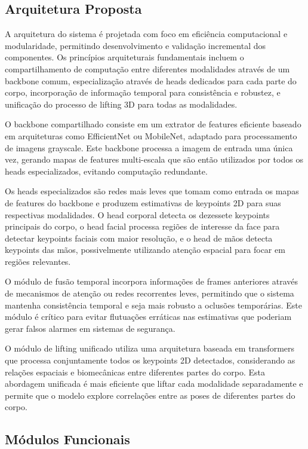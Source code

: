\documentclass[12pt, a4paper]{article}
\begin{document}
\subsection{Arquitetura Proposta}

A arquitetura do sistema é projetada com foco em eficiência computacional e modularidade, permitindo desenvolvimento e validação incremental dos componentes. Os princípios arquiteturais fundamentais incluem o compartilhamento de computação entre diferentes modalidades através de um backbone comum, especialização através de heads dedicados para cada parte do corpo, incorporação de informação temporal para consistência e robustez, e unificação do processo de lifting 3D para todas as modalidades.

O backbone compartilhado consiste em um extrator de features eficiente baseado em arquiteturas como EfficientNet ou MobileNet, adaptado para processamento de imagens grayscale. Este backbone processa a imagem de entrada uma única vez, gerando mapas de features multi-escala que são então utilizados por todos os heads especializados, evitando computação redundante.

Os heads especializados são redes mais leves que tomam como entrada os mapas de features do backbone e produzem estimativas de keypoints 2D para suas respectivas modalidades. O head corporal detecta os dezessete keypoints principais do corpo, o head facial processa regiões de interesse da face para detectar keypoints faciais com maior resolução, e o head de mãos detecta keypoints das mãos, possivelmente utilizando atenção espacial para focar em regiões relevantes.

O módulo de fusão temporal incorpora informações de frames anteriores através de mecanismos de atenção ou redes recorrentes leves, permitindo que o sistema mantenha consistência temporal e seja mais robusto a oclusões temporárias. Este módulo é crítico para evitar flutuações erráticas nas estimativas que poderiam gerar falsos alarmes em sistemas de segurança.

O módulo de lifting unificado utiliza uma arquitetura baseada em transformers que processa conjuntamente todos os keypoints 2D detectados, considerando as relações espaciais e biomecânicas entre diferentes partes do corpo. Esta abordagem unificada é mais eficiente que liftar cada modalidade separadamente e permite que o modelo explore correlações entre as poses de diferentes partes do corpo.

\subsection{Módulos Funcionais}
\end{document}
